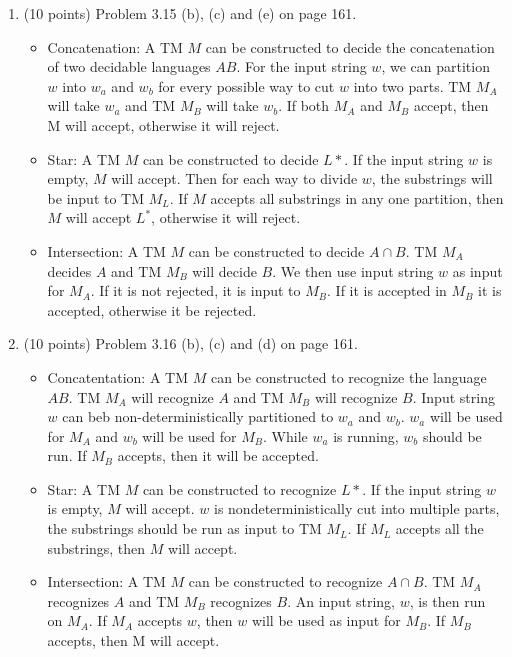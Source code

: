 \documentclass[11pt]{article}
\begin{document}
\begin{enumerate}
  \item (10 points) Problem 3.15 (b), (c) and (e) on page 161.
    \begin{itemize}
     \item Concatenation: A TM $M$ can be constructed to decide the concatenation of two decidable languages $AB$. For the input string
     $w$, we can partition $w$ into $w_a$ and $w_b$ for every possible way to cut $w$ into two parts. TM $M_A$ will take $w_a$ and TM $M_B$ will take $w_b$. If both
     $M_A$ and $M_B$ accept, then M will accept, otherwise it will reject.
     
     \item Star: A TM $M$ can be constructed to decide $L*$. If the input string $w$ is empty, $M$ will accept. Then for each way to divide
     $w$, the substrings will be input to TM $M_L$. If $M$ accepts all substrings in any one partition, then $M$ will accept $L^*$,
     otherwise it will reject.
     
     \item Intersection: A TM $M$ can be constructed to decide $A \cap B$. TM $M_A$ decides $A$ and TM $M_B$ will decide $B$. We then use
     input string $w$ as input for $M_A$. If it is not rejected, it is input to $M_B$. If it is accepted in $M_B$ it is accepted, otherwise
     it be rejected.
    \end{itemize}

      
  \item (10 points) Problem 3.16 (b), (c) and (d) on page 161.
  \begin{itemize}
    \item Concatentation: A TM $M$ can be constructed to recognize the language $AB$. TM $M_A$ will recognize $A$ and TM $M_B$ will 
	  recognize $B$. Input string $w$ can beb non-deterministically partitioned to $w_a$ and $w_b$. $w_a$ will be used for $M_A$ and
	  $w_b$ will be used for $M_B$. While $w_a$ is running, $w_b$ should be run. If $M_B$ accepts, then it will be accepted.
    \item Star: A TM $M$ can be constructed to recognize $L*$. If the input string $w$ is empty, $M$ will accept. $w$ is nondeterministically
	  cut into multiple parts, the substrings should be run as input to TM $M_L$. If $M_L$ accepts all the substrings, then $M$ will accept.
    \item Intersection: A TM $M$ can be constructed to recognize $A \cap B$. TM $M_A$ recognizes $A$ and TM $M_B$ recognizes $B$. An input
	  string, $w$, is then run on $M_A$. If $M_A$ accepts $w$, then $w$ will be used as input for $M_B$. If $M_B$ accepts, then M will
	  accept.
  \end{itemize}

\end{enumerate}
\end{document}
